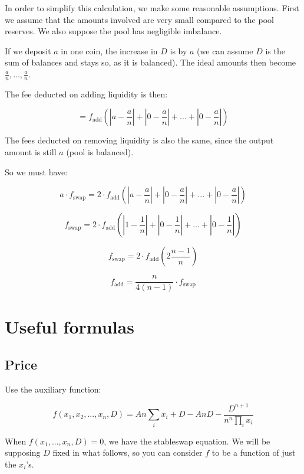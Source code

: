 \documentclass[
]{article}
\begin{document}
In order to simplify this calculation, we make some reasonable
assumptions. First we assume that the amounts involved are very small
compared to the pool reserves. We also suppose the pool has negligible
imbalance.

If we deposit \(a\) in one coin, the increase in \(D\) is by \(a\) (we
can assume \(D\) is the sum of balances and stays so, as it is
balanced). The ideal amounts then become
\(\frac{a}{n}, \dots, \frac{a}{n}\).

The fee deducted on adding liquidity is then:

\[ = f_{\operatorname{add}}\left( \left|a - \frac{a}{n}\right| + \left|0 - \frac{a}{n}\right| + ... + \left|0 - \frac{a}{n}\right| \right) \]

The fees deducted on removing liquidity is also the same, since the
output amount is still \(a\) (pool is balanced).

So we must have:

\[ a \cdot f_{\operatorname{swap}} = 2 \cdot f_{\operatorname{add}} \left( \left|a - \frac{a}{n}\right| + \left|0 - \frac{a}{n}\right| + ... + \left|0 - \frac{a}{n}\right| \right)\]

\[  f_{\operatorname{swap}} = 2 \cdot f_{\operatorname{add}} \left( \left|1 - \frac{1}{n}\right| + \left|0 - \frac{1}{n}\right| + ... + \left|0 - \frac{1}{n}\right| \right)\]

\[  f_{\operatorname{swap}} = 2 \cdot f_{\operatorname{add}} \left( 2 \frac{n-1}{n} \right)\]

\[  f_{\operatorname{add}} = \frac{n}{4(n - 1)} \cdot f_{\operatorname{swap}}\]

\hypertarget{useful-formulas}{%
\section{Useful formulas}\label{useful-formulas}}

\hypertarget{price}{%
\subsection{Price}\label{price}}

Use the auxiliary function:

\[ f(x_1, x_2, ..., x_n, D) = A n \sum_i x_i + D - A n D - \frac{D^{n+1}}{n^n \prod_i x_i} \]

When \(f(x_1, ..., x_n, D) = 0\), we have the stableswap equation. We
will be supposing \(D\) fixed in what follows, so you can consider \(f\)
to be a function of just the \(x_i\)'s.
\end{document}

